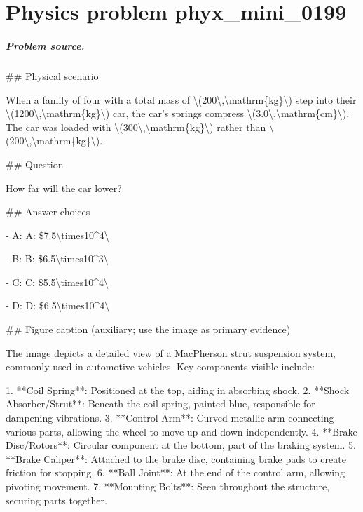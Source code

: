 
\chapter{Physics problem phyx\_mini\_0199}
\label{ch:PhyXMiniProblems_problem_phyx_mini_0199}

\paragraph{Problem source.}
\#\# Physical scenario

When a family of four with a total mass of \textbackslash{}(200\textbackslash{},\textbackslash{}mathrm\{kg\}\textbackslash{}) step into their \textbackslash{}(1200\textbackslash{},\textbackslash{}mathrm\{kg\}\textbackslash{}) car, the car's springs compress \textbackslash{}(3.0\textbackslash{},\textbackslash{}mathrm\{cm\}\textbackslash{}). The car was loaded with \textbackslash{}(300\textbackslash{},\textbackslash{}mathrm\{kg\}\textbackslash{}) rather than \textbackslash{}(200\textbackslash{},\textbackslash{}mathrm\{kg\}\textbackslash{}).

\#\# Question

How far will the car lower?

\#\# Answer choices

- A: A: \$7.5\textbackslash{}times10\textasciicircum{}4\textbackslash{}

- B: B: \$6.5\textbackslash{}times10\textasciicircum{}3\textbackslash{}

- C: C: \$5.5\textbackslash{}times10\textasciicircum{}4\textbackslash{}

- D: D: \$6.5\textbackslash{}times10\textasciicircum{}4\textbackslash{}

\#\# Figure caption (auxiliary; use the image as primary evidence)

The image depicts a detailed view of a MacPherson strut suspension system, commonly used in automotive vehicles. Key components visible include:

1. **Coil Spring**: Positioned at the top, aiding in absorbing shock.
2. **Shock Absorber/Strut**: Beneath the coil spring, painted blue, responsible for dampening vibrations.
3. **Control Arm**: Curved metallic arm connecting various parts, allowing the wheel to move up and down independently.
4. **Brake Disc/Rotors**: Circular component at the bottom, part of the braking system.
5. **Brake Caliper**: Attached to the brake disc, containing brake pads to create friction for stopping.
6. **Ball Joint**: At the end of the control arm, allowing pivoting movement.
7. **Mounting Bolts**: Seen throughout the structure, securing parts together.


